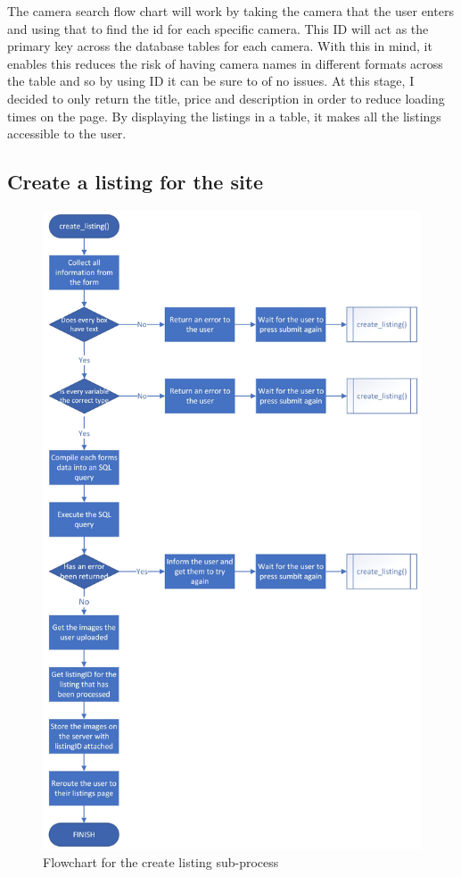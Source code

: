  The camera search flow chart will work by taking the camera that the user enters and using that to find the id for each specific camera. This ID will act as the primary key across the database tables for each camera. With this in mind, it enables this reduces the risk of having camera names in different formats across the table and so by using ID it can be sure to of no issues. At this stage, I decided to only return the title, price and description in order to reduce loading times on the page. By displaying the listings in a table, it makes all the listings accessible to the user.

 \subsection{Create a listing for the site}
 \begin{figure}[H]
     \centering
     \includegraphics[scale=0.3]{ch2_design/c3_createlisting2.jpeg}
     \caption{Flowchart for the create listing sub-process}
     \label{fig:flow_create}
 \end{figure}
